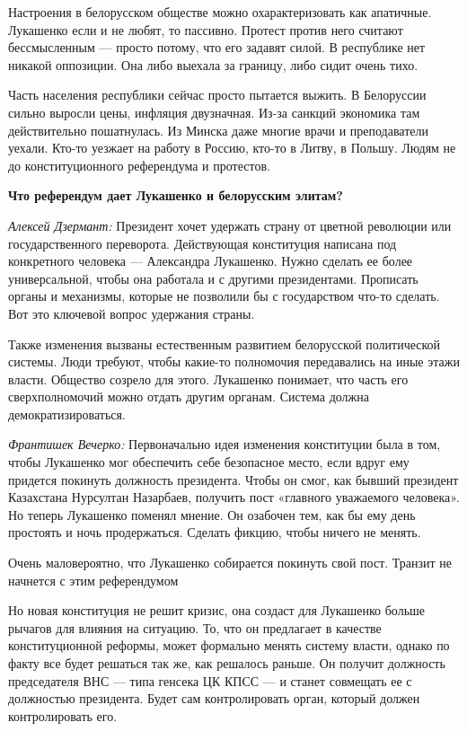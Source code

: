 Настроения в белорусском обществе можно охарактеризовать как апатичные. Лукашенко если и не любят, то пассивно. Протест против него считают бессмысленным — просто потому, что его задавят силой. В республике нет никакой оппозиции. Она либо выехала за границу, либо сидит очень тихо.

Часть населения республики сейчас просто пытается выжить. В Белоруссии сильно выросли цены, инфляция двузначная. Из-за санкций экономика там действительно пошатнулась. Из Минска даже многие врачи и преподаватели уехали. Кто-то уезжает на работу в Россию, кто-то в Литву, в Польшу. Людям не до конституционного референдума и протестов.

\textbf{Что референдум дает Лукашенко и белорусским элитам?}

\textit{Алексей Дзермант:} Президент хочет удержать страну от цветной революции или государственного переворота. Действующая конституция написана под конкретного человека — Александра Лукашенко. Нужно сделать ее более универсальной, чтобы она работала и с другими президентами. Прописать органы и механизмы, которые не позволили бы с государством что-то сделать. Вот это ключевой вопрос удержания страны.

Также изменения вызваны естественным развитием белорусской политической системы. Люди требуют, чтобы какие-то полномочия передавались на иные этажи власти. Общество созрело для этого. Лукашенко понимает, что часть его сверхполномочий можно отдать другим органам. Система должна демократизироваться.

\textit{Франтишек Вечерко:} Первоначально идея изменения конституции была в том, чтобы Лукашенко мог обеспечить себе безопасное место, если вдруг ему придется покинуть должность президента. Чтобы он смог, как бывший президент Казахстана Нурсултан Назарбаев, получить пост «главного уважаемого человека». Но теперь Лукашенко поменял мнение. Он озабочен тем, как бы ему день простоять и ночь продержаться. Сделать фикцию, чтобы ничего не менять.

\begin{fancyquotes}
    Очень маловероятно, что Лукашенко собирается покинуть свой пост. Транзит не начнется с этим референдумом
\end{fancyquotes}

Но новая конституция не решит кризис, она создаст для Лукашенко больше рычагов для влияния на ситуацию. То, что он предлагает в качестве конституционной реформы, может формально менять систему власти, однако по факту все будет решаться так же, как решалось раньше. Он получит должность председателя ВНС — типа генсека ЦК КПСС — и станет совмещать ее с должностью президента. Будет сам контролировать орган, который должен контролировать его.



